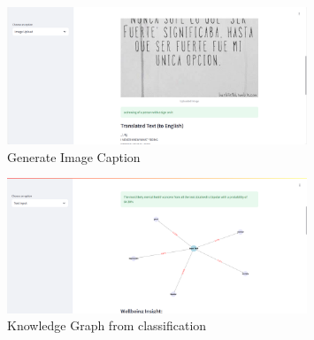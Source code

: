 \begin{figure}[h!]  
    \centering
    \includegraphics[width=0.8\textwidth]{App Images/18 Interface.png}  
    \caption{Generate Image Caption}
    \label{10i234}  %
\end{figure}   

\begin{figure}[h!]  
    \centering
    \includegraphics[width=0.8\textwidth]{App Images/19 Interface.png}  
    \caption{Knowledge Graph from classification}
    \label{10i23445}  %
\end{figure}  

